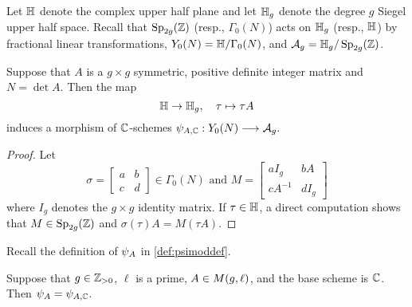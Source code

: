 \documentclass{amsart}
\begin{document}
Let $\mathbb{H}$ denote the complex upper half plane and let $\mathbb{H}_g$ denote the degree $g$ Siegel upper half space. Recall that $\operatorname{Sp}_{2g}(\mathbb{Z})$ (resp., $\Gamma_0(N)$) acts on $\mathbb{H}_g$ (resp., $\mathbb{H}$) by fractional linear transformations,
 $Y_0(N) = \mathbb{H}/\Gamma_0(N)$, and $\mathcal{A}_g = \mathbb{H}_g/\operatorname{Sp}_{2g}(\mathbb{Z})$.
\begin{lemma}\label{lem:psi-A-n}
Suppose that $A$ is a $g \times g$ symmetric, positive definite integer matrix and $N = \det A$.
Then the map \[
  \mathbb{H} \to \mathbb{H}_g, \quad  \tau \mapsto \tau A
\]
induces a morphism of $\mathbb{C}$-schemes
$
  {\psi}_{A, \mathbb{C}}: Y_0(N) \longrightarrow \mathcal{A}_g.
$
\end{lemma}

\begin{proof}
Let
\[
\sigma = \begin{bmatrix} a & b \\ c & d \end{bmatrix} \in \Gamma_0(N) \text{ and } M = \begin{bmatrix} aI_g & bA \\ cA^{-1} & dI_g \end{bmatrix}
\]
where $I_g$ denotes the $g \times g$ identity matrix.
If $\tau \in \mathbb{H}$, a direct computation shows that $M \in\operatorname{Sp}_{2g}(\mathbb{Z})$
and  $\sigma(\tau)A = M(\tau A)$.
\end{proof}

Recall the definition of $\psi_{A}$ in \eqref{def:psimoddef}.

\begin{lemma}\label{lemma:psimod-over-c}
Suppose that $g\in\mathbb{Z}_{>0}$, $\ell$ is a prime, $A \in M(g,\ell)$, and
 the base scheme is $\mathbb{C}$. Then $\psi_{A} = {\psi}_{A, \mathbb{C}}$.
\end{lemma}
\end{document}
